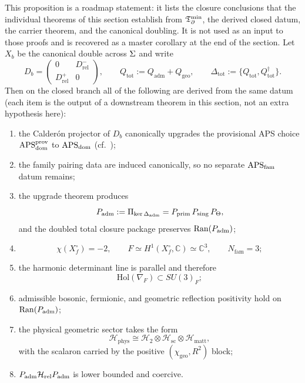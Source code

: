 \begin{proposition}
\label{thm:master-closure}
\label{prop:master-closure-roadmap}
\label{ass:remaining-closure-inputs}
This proposition is a roadmap statement: it lists the closure conclusions that the individual
theorems of this section establish from $\mathfrak T_{\partial}^{\min}$, the derived closed datum, the carrier theorem, and the
canonical doubling. It is not used as an input to those proofs and is recovered as a master
corollary at the end of the section. Let $X_b$ be the canonical double across $\Sigma$ and write
\[
D_b=
\begin{pmatrix}
0&D_{\mathrm{rel}}^-\\
D_{\mathrm{rel}}^+&0
\end{pmatrix},
\qquad
Q_{\mathrm{tot}}:=Q_{\mathrm{adm}}+Q_{\mathrm{geo}},
\qquad
\Delta_{\mathrm{tot}}:=\{Q_{\mathrm{tot}},Q_{\mathrm{tot}}^\dagger\}.
\]
Then on the closed branch all of the following are derived from the same datum (each item is the
output of a downstream theorem in this section, not an extra hypothesis here):
\begin{enumerate}[label=(\arabic*), leftmargin=1.5em, topsep=3pt, itemsep=2pt]
    \item the Calder\'on projector of $D_b$ canonically upgrades the provisional APS choice
    $\mathrm{APS}_{\mathrm{dom}}^{\mathrm{prov}}$ to $\mathrm{APS}_{\mathrm{dom}}$ (cf.\ );
    \item the family pairing data are induced canonically, so no separate $\mathrm{APS}_{\mathrm{fam}}$ datum remains;
    \item the upgrade theorem  produces
    \[
    P_{\mathrm{adm}}:=\Pi_{\ker \Delta_{\mathrm{adm}}}
    =
    P_{\mathrm{prim}}\,P_{\mathrm{sing}}\,P_\Theta,
    \]
    and the doubled total closure package preserves $\mathrm{Ran}(P_{\mathrm{adm}})$;
    \item
    \[
    \chi(X_f^\circ)=-2,
    \qquad
    F\simeq H^1(X_f^\circ,\mathbb C)\simeq \mathbb C^3,
    \qquad
    N_{\mathrm{fam}}=3;
    \]
    \item the harmonic determinant line is parallel and therefore
    \[
    \mathrm{Hol}(\nabla_F)\subset SU(3)_F;
    \]
    \item admissible bosonic, fermionic, and geometric reflection positivity hold on $\mathrm{Ran}(P_{\mathrm{adm}})$;
    \item the physical geometric sector takes the form
    \[
    \mathcal H_{\mathrm{phys}}
    \cong
    \mathcal H_2\otimes\mathcal H_{\mathrm{sc}}\otimes\mathcal H_{\mathrm{matt}},
    \]
    with the scalaron carried by the positive $(\chi_{\mathrm{geo}},R^2)$ block;
    \item $P_{\mathrm{adm}}\mathcal H_{\mathrm{rel}}P_{\mathrm{adm}}$ is lower bounded and coercive.
\end{enumerate}
\end{proposition}

